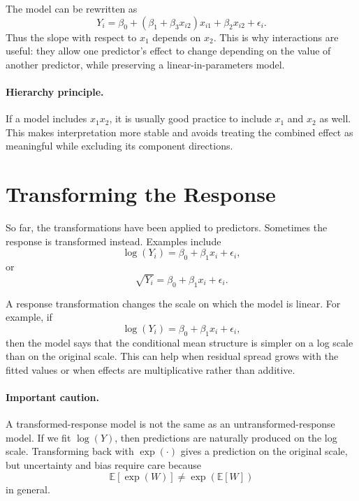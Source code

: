 The model can be rewritten as
\begin{equation}
  Y_i=\beta_0+\left(\beta_1+\beta_3x_{i2}\right)x_{i1}+\beta_2x_{i2}+\epsilon_i.
\end{equation}
Thus the slope with respect to \(x_1\) depends on \(x_2\).  This is why interactions are useful: they allow one predictor's effect to change depending on the value of another predictor, while preserving a linear-in-parameters model.

\paragraph{Hierarchy principle.}
If a model includes \(x_1x_2\), it is usually good practice to include \(x_1\) and \(x_2\) as well.  This makes interpretation more stable and avoids treating the combined effect as meaningful while excluding its component directions.

\section{Transforming the Response}

So far, the transformations have been applied to predictors.  Sometimes the response is transformed instead.  Examples include
\begin{equation}
  \log(Y_i)=\beta_0+\beta_1x_i+\epsilon_i,
\end{equation}
or
\begin{equation}
  \sqrt{Y_i}=\beta_0+\beta_1x_i+\epsilon_i.
\end{equation}

A response transformation changes the scale on which the model is linear.  For example, if
\begin{equation}
  \log(Y_i)=\beta_0+\beta_1x_i+\epsilon_i,
\end{equation}
then the model says that the conditional mean structure is simpler on a log scale than on the original scale.  This can help when residual spread grows with the fitted values or when effects are multiplicative rather than additive.

\paragraph{Important caution.}
A transformed-response model is not the same as an untransformed-response model.  If we fit \(\log(Y)\), then predictions are naturally produced on the log scale.  Transforming back with \(\exp(\cdot)\) gives a prediction on the original scale, but uncertainty and bias require care because
\begin{equation}
  \mathbb{E}[\exp(W)] \ne \exp(\mathbb{E}[W])
\end{equation}
in general.

